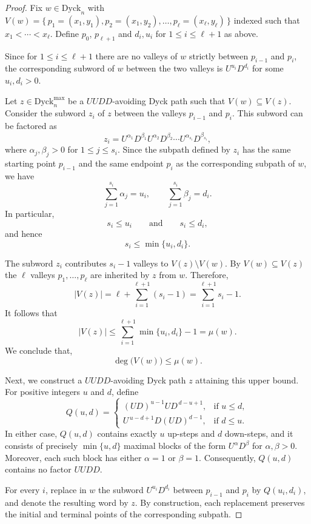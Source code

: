 \documentclass[11pt]{amsart}
\def\Dyck{\mathrm{Dyck}}
\theoremstyle{plain}
\numberwithin{lemma}{\DefaultNumberTheoremWithin}
\numberwithin{theorem}{\DefaultNumberTheoremWithin}
\numberwithin{corollary}{\DefaultNumberTheoremWithin}
\numberwithin{proposition}{\DefaultNumberTheoremWithin}
\numberwithin{conjecture}{\DefaultNumberTheoremWithin}
\theoremstyle{definition}
\numberwithin{definition}{\DefaultNumberTheoremWithin}
\numberwithin{question}{\DefaultNumberTheoremWithin}
\numberwithin{problem}{\DefaultNumberTheoremWithin}
\theoremstyle{remark}
\numberwithin{remark}{\DefaultNumberTheoremWithin}
\numberwithin{example}{\DefaultNumberTheoremWithin}
\numberwithin{claim}{\DefaultNumberTheoremWithin}
\begin{document}
\begin{proof}
Fix $w\in\Dyck_n$ with
$V(w)=\big\{\,p_1 = (x_1,y_1),p_2=(x_1,y_2),\ldots, p_\ell=(x_\ell,y_\ell)\,\big\}$
indexed such that $x_1 < \cdots < x_\ell$. Define $p_0$, $p_{\ell+1}$ and 
$d_i,u_i$ for $1 \leq i \leq \ell+1$ as above.

Since for $1 \leq i \leq \ell+1$ there are no valleys of $w$ strictly between
$p_{i-1}$ and $p_i$, the corresponding subword of $w$ between the two valleys is
$U^{u_i}D^{d_i}$ for some $u_i, d_i > 0$.

Let $z\in\Dyck^ {\max}_n$ be a $UUDD$-avoiding Dyck path such that
$
V(w)\subseteq V(z).
$
Consider the subword $z_i$ of $z$ between the valleys $p_{i-1}$ and $p_i$.
This subword can be factored as
\[
z_i = U^{\alpha_1}D^{\beta_1}
U^{\alpha_2}D^{\beta_2}
\cdots
U^{\alpha_{s_i}}D^{\beta_{s_i}},
\]
where $\alpha_j,\beta_j > 0$ for $1 \leq j \leq s_i$. Since the
subpath defined by $z_i$ has the same starting point $p_{i-1}$ and
the same endpoint $p_{i}$ as the corresponding subpath of
$w$, we have
\[
\sum_{j=1}^{s_i}\alpha_j=u_i,
\qquad
\sum_{j=1}^{s_i}\beta_j=d_i.
\]
In particular,
\[
s_i\leq u_i
\qquad\text{and}\qquad
s_i\leq d_i,
\]
and hence
\[
s_i\leq\min\{u_i,d_i\}.
\]

The subword $z_i$ contributes $s_i-1$
valleys to $V(z) \setminus V(w)$. By $V(w) \subseteq V(z)$ 
the $\ell$ valleys 
$p_1,\ldots, p_\ell$ are inherited by $z$ from $w$. 
Therefore,
\[
|V(z)|
=
\ell+\sum_{i=1}^{\ell+1}(s_i-1)
=
\sum_{i=1}^{\ell+1}s_i-1.
\]
It follows that
\[
|V(z)|
\leq
\sum_{i=1}^{\ell+1}\min\{u_i,d_i\}-1
=
\mu(w).
\]
We conclude that,
\[
\deg\bigl(V(w)\bigr)\leq\mu(w).
\]

Next, we construct a $UUDD$-avoiding Dyck path $z$ attaining this
upper bound. For positive integers $u$ and $d$, define
\[
Q(u,d)
=
\begin{cases}
(UD)^{u-1}UD^{\,d-u+1},
   &\text{if }u\leq d,\\
U^{\,u-d+1}D(UD)^{d-1},
   &\text{if }d\leq u.
\end{cases}
\]
In either case, $Q(u,d)$ contains exactly $u$ up-steps and $d$
down-steps, and it consists of precisely
$\min\{u,d\}$
maximal blocks of the form $U^\alpha D^\beta$ for $\alpha,\beta > 0$. Moreover, each
such block has either $\alpha=1$ or $\beta=1$. Consequently,
$Q(u,d)$ contains no factor $UUDD$.

For every $i$, replace in $w$ the subword 
$U^{u_i}D^{d_i}$ between $p_{i-1}$ and $p_i$ 
by $Q(u_i,d_i)$, and denote the resulting word by
$z$. By construction, each replacement preserves the initial and terminal
points of the corresponding subpath. 


\end{proof}
\end{document}
